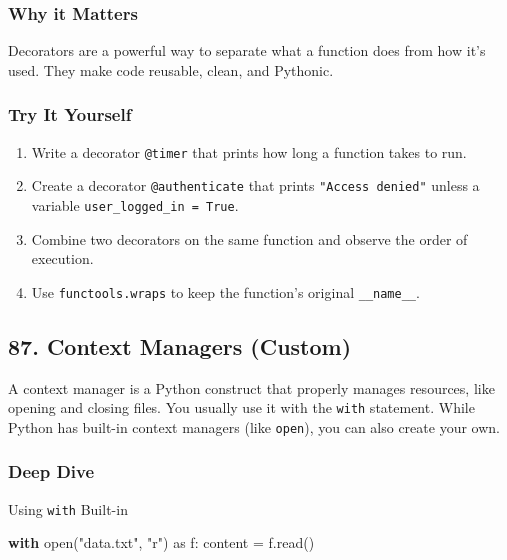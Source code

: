 \documentclass[
  letterpaper,
  DIV=11,
  numbers=noendperiod]{scrreprt}
\newenvironment{Shaded}{\begin{snugshade}}{\end{snugshade}}
\newcommand{\BuiltInTok}[1]{\textcolor[rgb]{0.00,0.23,0.31}{#1}}
\newcommand{\ControlFlowTok}[1]{\textcolor[rgb]{0.00,0.23,0.31}{\textbf{#1}}}
\newcommand{\ImportTok}[1]{\textcolor[rgb]{0.00,0.46,0.62}{#1}}
\newcommand{\NormalTok}[1]{\textcolor[rgb]{0.00,0.23,0.31}{#1}}
\newcommand{\OperatorTok}[1]{\textcolor[rgb]{0.37,0.37,0.37}{#1}}
\newcommand{\StringTok}[1]{\textcolor[rgb]{0.13,0.47,0.30}{#1}}
\providecommand{\tightlist}{%
  \setlength{\itemsep}{0pt}\setlength{\parskip}{0pt}}
\begin{document}
\subsubsection{Why it Matters}\label{why-it-matters-85}

Decorators are a powerful way to separate what a function does from how
it's used. They make code reusable, clean, and Pythonic.

\subsubsection{Try It Yourself}\label{try-it-yourself-85}

\begin{enumerate}
\def\labelenumi{\arabic{enumi}.}
\tightlist
\item
  Write a decorator \texttt{@timer} that prints how long a function
  takes to run.
\item
  Create a decorator \texttt{@authenticate} that prints
  \texttt{"Access\ denied"} unless a variable
  \texttt{user\_logged\_in\ =\ True}.
\item
  Combine two decorators on the same function and observe the order of
  execution.
\item
  Use \texttt{functools.wraps} to keep the function's original
  \texttt{\_\_name\_\_}.
\end{enumerate}

\subsection{87. Context Managers
(Custom)}\label{context-managers-custom}

A context manager is a Python construct that properly manages resources,
like opening and closing files. You usually use it with the
\texttt{with} statement. While Python has built-in context managers
(like \texttt{open}), you can also create your own.

\subsubsection{Deep Dive}\label{deep-dive-86}

Using \texttt{with} Built-in

\begin{Shaded}
\begin{Highlighting}[]
\ControlFlowTok{with} \BuiltInTok{open}\NormalTok{(}\StringTok{"data.txt"}\NormalTok{, }\StringTok{"r"}\NormalTok{) }\ImportTok{as}\NormalTok{ f:}
\NormalTok{    content }\OperatorTok{=}\NormalTok{ f.read()}
\end{Highlighting}
\end{Shaded}
\end{document}
